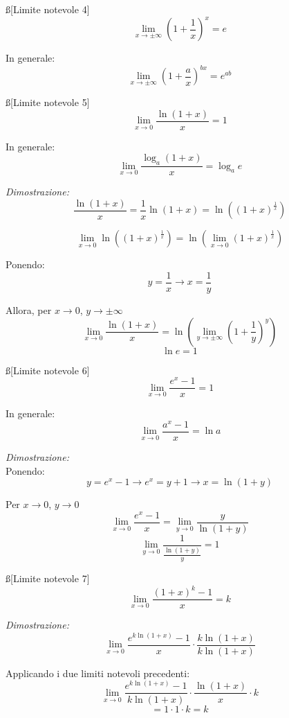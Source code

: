 \documentclass[12pt]{article}
\begin{document}
\ss[Limite notevole 4]
$$ \lim_{x \to \pm \infty} \left(1 + \frac{1}{x}\right)^x = e $$

In generale:
$$ \lim_{x \to \pm \infty} \left(1 + \frac{a}{x}\right)^{bx} = e^{ab} $$

\ss[Limite notevole 5]
$$ \lim_{x \to 0} \frac{\ln(1 + x)}{x} = 1 $$

In generale:
$$ \lim_{x \to 0} \frac{\log_{a}(1 + x)}{x} = \log_a{e} $$

\textit{Dimostrazione:}
$$ \frac{\ln(1 + x)}{x} = \frac{1}{x}\ln(1 + x) = \ln\left((1+x)^{\frac{1}{x}}\right) $$

$$ \lim_{x \to 0} \ln\left((1+x)^{\frac{1}{x}}\right) = \ln\left(\lim_{x \to 0} (1+x)^{\frac{1}{x}}\right) $$

Ponendo:
$$ y = \frac{1}{x} \rightarrow x = \frac{1}{y} $$

Allora, per $x \to 0$, $y \to \pm\infty$
$$ \lim_{x \to 0} \frac{\ln(1 + x)}{x} = \ln\left(\lim_{y \to \pm\infty} \left(1+\frac{1}{y}\right)^y\right) $$
$$ \ln{e} = 1 $$

\ss[Limite notevole 6]
$$ \lim_{x\to 0} \frac{e^x-1}{x} = 1 $$

In generale:
$$ \lim_{x\to 0} \frac{a^x-1}{x} = \ln{a} $$

\textit{Dimostrazione:} \\
Ponendo:
$$ y = e^x - 1 \rightarrow e^x = y + 1 \rightarrow x = \ln(1 + y) $$

Per $x \to 0$, $y \to 0$
$$ \lim_{x\to 0} \frac{e^x-1}{x} = \lim_{y\to 0} \frac{y}{\ln(1+y)} $$
$$ \lim_{y\to 0} \frac{1}{\frac{\ln(1+y)}{y}} = 1 $$

\ss[Limite notevole 7]
$$ \lim_{x\to 0} \frac{(1+x)^k-1}{x} = k $$

\textit{Dimostrazione:} 
$$ \lim_{x\to 0} \frac{e^{k\ln(1+x)}-1}{x} \cdot \frac{k\ln(1+x)}{k\ln(1+x)} $$

Applicando i due limiti notevoli precedenti:
$$ \lim_{x\to 0} \frac{e^{k\ln(1+x)}-1}{k\ln(1+x)} \cdot \frac{\ln(1+x)}{x} \cdot k $$
$$ = 1 \cdot 1 \cdot k = k $$
\end{document}
